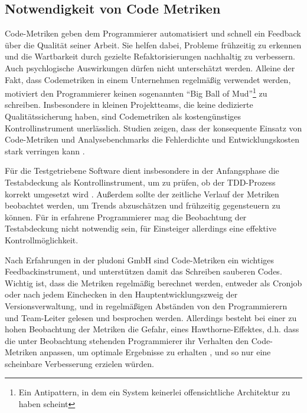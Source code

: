  \subsection{Notwendigkeit von Code Metriken}
 
 Code-Metriken geben dem Programmierer automatisiert und schnell ein Feedback über die Qualität seiner Arbeit. Sie helfen dabei, Probleme frühzeitig zu erkennen und die Wartbarkeit durch gezielte Refaktorisierungen nachhaltig zu verbessern. Auch psychlogische Auswirkungen dürfen nicht unterschätzt werden. Alleine der Fakt, dass Codemetriken in einem Unternehmen regelmäßig verwendet werden, motiviert den Programmierer keinen sogenannten "`Big Ball of Mud"'\footnote{Ein Antipattern, in dem ein System keinerlei offensichtliche Architektur zu haben scheint} zu schreiben. Insbesondere in kleinen Projektteams, die keine dedizierte Qualitätssicherung haben, sind Codemetriken als kostengünstiges Kontrollinstrument unerlässlich. Studien zeigen, dass der konsequente Einsatz von Code-Metriken und Analysebenchmarks die Fehlerdichte und Entwicklungskosten stark verringen kann \citep[S.10f]{baggen_standardized_2011}.
 
 Für die Testgetriebene Software dient insbesondere in der Anfangsphase die Testabdeckung als Kontrollinstrument, um zu prüfen, ob der TDD-Prozess korrekt umgesetzt wird \citep[S. 300]{nagappan_realizing_2008}. Außerdem sollte der zeitliche Verlauf der Metriken beobachtet werden, um Trends abzuschätzen und frühzeitig gegensteuern zu können. Für in  erfahrene Programmierer mag die Beobachtung der Testabdeckung nicht notwendig sein, für Einsteiger allerdings eine effektive Kontrollmöglichkeit.
 
 Nach Erfahrungen in der pludoni GmbH sind Code-Metriken ein wichtiges Feedbackinstrument, und unterstützen damit das Schreiben sauberen Codes. Wichtig ist, dass die Metriken regelmäßig berechnet werden, entweder als Cronjob oder nach jedem Einchecken in den Hauptentwicklungszweig der Versionsverwaltung, und in regelmäßigen Abständen von den Programmierern und Team-Leiter gelesen und besprochen werden. Allerdings besteht bei einer zu hohen Beobachtung der Metriken die Gefahr, eines Hawthorne-Effektes, d.h. dass die unter Beobachtung stehenden Programmierer ihr Verhalten den Code-Metriken anpassen, um optimale Ergebnisse zu erhalten \citep[52. Karte]{langr_agile_2011}, und so nur eine scheinbare Verbesserung erzielen würden.
